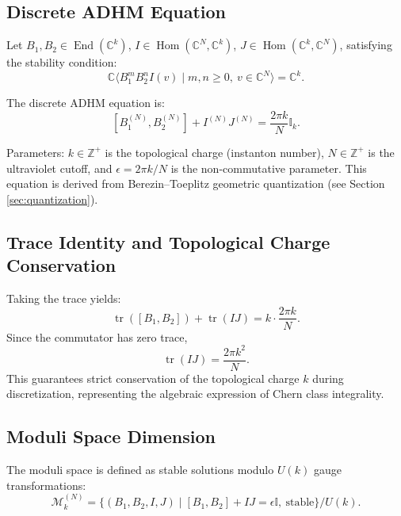 \documentclass[12pt,a4paper]{amsart}
\theoremstyle{plain}
\theoremstyle{definition}
\theoremstyle{remark}
\DeclareMathOperator{\tr}{tr}
\DeclareMathOperator{\End}{End}
\DeclareMathOperator{\Hom}{Hom}
\begin{document}
\subsection{Discrete ADHM Equation}

Let $B_1,B_2\in\End(\mathbb{C}^k)$, $I\in\Hom(\mathbb{C}^N,\mathbb{C}^k)$, $J\in\Hom(\mathbb{C}^k,\mathbb{C}^N)$, satisfying the stability condition:
\begin{equation}
\mathbb{C}\langle B_1^m B_2^n I(v)\mid m,n\ge0,\ v\in\mathbb{C}^N\rangle = \mathbb{C}^k.
\end{equation}

The discrete ADHM equation is:
\begin{equation}\label{eq:core}
\boxed{[B_1^{(N)}, B_2^{(N)}] + I^{(N)}J^{(N)} = \frac{2\pi k}{N}\mathbb{I}_k.}
\end{equation}

Parameters: $k\in\mathbb{Z}^+$ is the topological charge (instanton number), $N\in\mathbb{Z}^+$ is the ultraviolet cutoff, and $\epsilon=2\pi k/N$ is the non-commutative parameter. This equation is derived from Berezin--Toeplitz geometric quantization (see Section \ref{sec:quantization}).

\subsection{Trace Identity and Topological Charge Conservation}

Taking the trace yields:
\begin{equation}
\tr([B_1,B_2]) + \tr(IJ) = k\cdot\frac{2\pi k}{N}.
\end{equation}
Since the commutator has zero trace,
\begin{equation}\label{eq:trace}
\boxed{\tr(IJ) = \frac{2\pi k^2}{N}.}
\end{equation}
This guarantees strict conservation of the topological charge $k$ during discretization, representing the algebraic expression of Chern class integrality.

\subsection{Moduli Space Dimension}

The moduli space is defined as stable solutions modulo $U(k)$ gauge transformations:
\begin{equation}
\mathcal{M}_k^{(N)} = \{(B_1,B_2,I,J)\mid [B_1,B_2]+IJ=\epsilon\mathbb{I},\ \text{stable}\}/U(k).
\end{equation}
\end{document}
